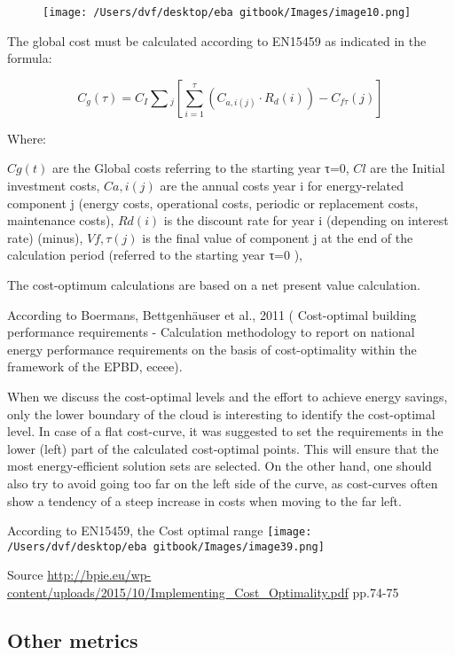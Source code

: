 \documentclass[]{book}
\theoremstyle{definition}
\theoremstyle{definition}
\theoremstyle{definition}
\theoremstyle{remark}
\begin{document}
\begin{figure}[htbp]
\centering
\texttt{[image: /Users/dvf/desktop/eba gitbook/Images/image10.png]}
\caption{}
\end{figure}

The global cost must be calculated according to EN15459 as indicated in
the formula:

\[C_{g}(\tau) = C_I \sum{_j}[ \sum_{i=1}^{\tau}(C_{a,i(j)} \cdot R_d(i)) - C_{f\tau}(j)]\]

Where:

\(Cg(t)\) are the Global costs referring to the starting year τ=0,
\(Cl\) are the Initial investment costs, \(Ca,i(j)\) are the annual
costs year i for energy-related component j (energy costs, operational
costs, periodic or replacement costs, maintenance costs), \(Rd(i)\) is
the discount rate for year i (depending on interest rate) (minus),
\(Vf,τ(j)\) is the final value of component j at the end of the
calculation period (referred to the starting year τ=0 ),

The cost-optimum calculations are based on a net present value
calculation.

According to Boermans, Bettgenhäuser et al., 2011 ( Cost-optimal
building performance requirements - Calculation methodology to report on
national energy performance requirements on the basis of cost-optimality
within the framework of the EPBD, eceee).

When we discuss the cost-optimal levels and the effort to achieve energy
savings, only the lower boundary of the cloud is interesting to identify
the cost-optimal level. In case of a flat cost-curve, it was suggested
to set the requirements in the lower (left) part of the calculated
cost-optimal points. This will ensure that the most energy-efficient
solution sets are selected. On the other hand, one should also try to
avoid going too far on the left side of the curve, as cost-curves often
show a tendency of a steep increase in costs when moving to the far
left.

According to EN15459, the Cost optimal range
\texttt{[image: /Users/dvf/desktop/eba gitbook/Images/image39.png]}

Source
\url{http://bpie.eu/wp-content/uploads/2015/10/Implementing_Cost_Optimality.pdf}
pp.74-75

\subsection{Other metrics}\label{other-metrics}
\end{document}
